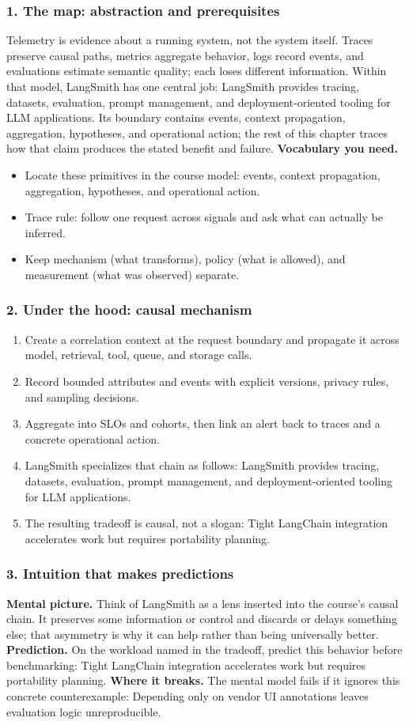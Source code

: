 \subsubsection*{1. The map: abstraction and prerequisites}
Telemetry is evidence about a running system, not the system itself. Traces preserve causal paths, metrics aggregate behavior, logs record events, and evaluations estimate semantic quality; each loses different information.
Within that model, LangSmith has one central job: LangSmith provides tracing, datasets, evaluation, prompt management, and deployment-oriented tooling for LLM applications. Its boundary contains events, context propagation, aggregation, hypotheses, and operational action; the rest of this chapter traces how that claim produces the stated benefit and failure.
\textbf{Vocabulary you need.}\begin{itemize}
\item Locate these primitives in the course model: events, context propagation, aggregation, hypotheses, and operational action.
\item Trace rule: follow one request across signals and ask what can actually be inferred.
\item Keep mechanism (what transforms), policy (what is allowed), and measurement (what was observed) separate.
\end{itemize}
\subsubsection*{2. Under the hood: causal mechanism}\begin{enumerate}
\item Create a correlation context at the request boundary and propagate it across model, retrieval, tool, queue, and storage calls.
\item Record bounded attributes and events with explicit versions, privacy rules, and sampling decisions.
\item Aggregate into SLOs and cohorts, then link an alert back to traces and a concrete operational action.
\item LangSmith specializes that chain as follows: LangSmith provides tracing, datasets, evaluation, prompt management, and deployment-oriented tooling for LLM applications.
\item The resulting tradeoff is causal, not a slogan: Tight LangChain integration accelerates work but requires portability planning.
\end{enumerate}
\subsubsection*{3. Intuition that makes predictions}
\textbf{Mental picture.} Think of LangSmith as a lens inserted into the course's causal chain. It preserves some information or control and discards or delays something else; that asymmetry is why it can help rather than being universally better.
\textbf{Prediction.} On the workload named in the tradeoff, predict this behavior before benchmarking: Tight LangChain integration accelerates work but requires portability planning.
\textbf{Where it breaks.} The mental model fails if it ignores this concrete counterexample: Depending only on vendor UI annotations leaves evaluation logic unreproducible.
